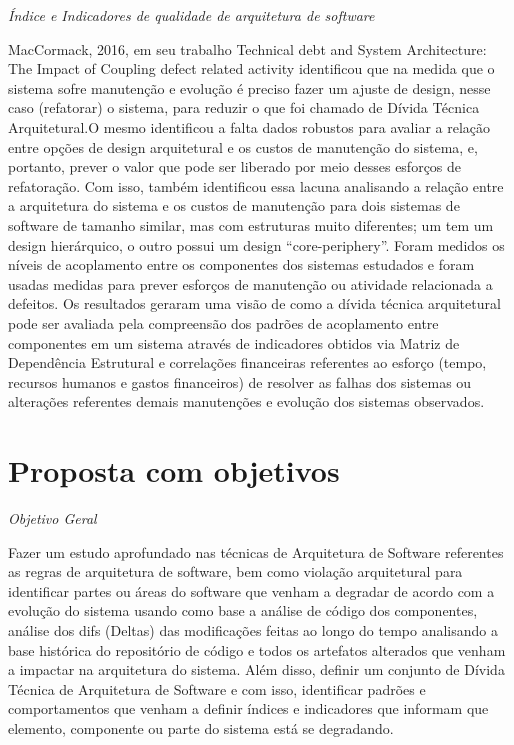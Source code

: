 \documentclass[
	12pt,				%
	openright,			%
	twoside,			%
	a4paper,			%
	english,			%
	french,				%
	spanish,			%
	brazil,				%
	]{abntex2}
\begin{document}
\emph{Índice e Indicadores de qualidade de arquitetura de software }

MacCormack, 2016, em seu trabalho \textquotedbl{}Technical debt and
System Architecture: The Impact of Coupling defect related activity\textquotedbl{}
identificou que na medida que o sistema sofre manutenção e evolução
é preciso fazer um ajuste de design, nesse caso (\textquotedbl{}refatorar\textquotedbl{})
o sistema, para reduzir o que foi chamado de \textquotedbl{}Dívida
Técnica Arquitetural\textquotedbl{}.O mesmo identificou a falta dados
robustos para avaliar a relação entre opções de design arquitetural
e os custos de manutenção do sistema, e, portanto, prever o valor
que pode ser liberado por meio desses esforços de refatoração. Com
isso, também identificou essa lacuna analisando a relação entre a
arquitetura do sistema e os custos de manutenção para dois sistemas
de software de tamanho similar, mas com estruturas muito diferentes;
um tem um design \textquotedbl{}hierárquico\textquotedbl{}, o outro
possui um design \textquotedblleft core-periphery\textquotedblright .
Foram medidos os níveis de acoplamento entre os componentes dos sistemas
estudados e foram usadas medidas para prever esforços de manutenção
ou \textquotedbl{}atividade relacionada a defeitos\textquotedbl{}.
Os resultados geraram uma visão de como a dívida técnica arquitetural
pode ser avaliada pela compreensão dos padrões de acoplamento entre
componentes em um sistema através de indicadores obtidos via Matriz
de Dependência Estrutural e correlações financeiras referentes ao
esforço (tempo, recursos humanos e gastos financeiros) de resolver
as falhas dos sistemas ou alterações referentes demais manutenções
e evolução dos sistemas observados. 

\chapter{Proposta com objetivos }


\emph{Objetivo Geral}

Fazer um estudo aprofundado nas técnicas de Arquitetura de Software
referentes as regras de arquitetura de software, bem como violação
arquitetural para identificar partes ou áreas do software que venham
a degradar de acordo com a evolução do sistema usando como base a
análise de código dos componentes, análise dos \textquotedbl{}difs\textquotedbl{}
(Deltas) das modificações feitas ao longo do tempo analisando a base
histórica do repositório de código e todos os artefatos alterados
que venham a impactar na arquitetura do sistema. Além disso, definir
um conjunto de Dívida Técnica de Arquitetura de Software e com isso,
identificar padrões e comportamentos que venham a definir índices
e indicadores que informam que elemento, componente ou parte do sistema
está se degradando. 
\end{document}
